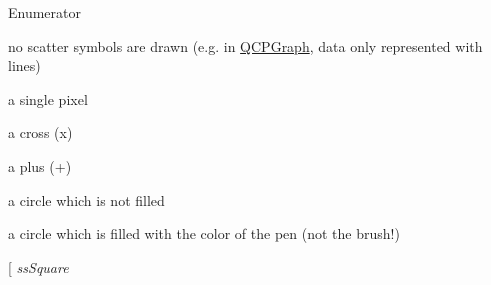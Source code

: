 \begin{Desc}
\item[Enumerator]\par
\begin{description}
\item[{\em 
\hypertarget{a00143_af66d0711d42fe78d96c28abadc67f26fa3ee9f603bc4623e9b98011e8829aad1d}{ss\+None}\label{a00143_af66d0711d42fe78d96c28abadc67f26fa3ee9f603bc4623e9b98011e8829aad1d}
}]no scatter symbols are drawn (e.\+g. in \hyperlink{a00031}{Q\+C\+P\+Graph}, data only represented with lines) \item[{\em 
\hypertarget{a00143_af66d0711d42fe78d96c28abadc67f26fa56816c1386f1356417bcc013adf0367c}{ss\+Dot}\label{a00143_af66d0711d42fe78d96c28abadc67f26fa56816c1386f1356417bcc013adf0367c}
}]a single pixel \item[{\em 
\hypertarget{a00143_af66d0711d42fe78d96c28abadc67f26fab1d52c10ee4b09fe17854be238055f30}{ss\+Cross}\label{a00143_af66d0711d42fe78d96c28abadc67f26fab1d52c10ee4b09fe17854be238055f30}
}]a cross (x) \item[{\em 
\hypertarget{a00143_af66d0711d42fe78d96c28abadc67f26fa82b8526e3bfa7d0cccc1fd5eb16505ac}{ss\+Plus}\label{a00143_af66d0711d42fe78d96c28abadc67f26fa82b8526e3bfa7d0cccc1fd5eb16505ac}
}]a plus (+) \item[{\em 
\hypertarget{a00143_af66d0711d42fe78d96c28abadc67f26fa13ed43d724ecefa84baae4179de3bd8d}{ss\+Circle}\label{a00143_af66d0711d42fe78d96c28abadc67f26fa13ed43d724ecefa84baae4179de3bd8d}
}]a circle which is not filled \item[{\em 
\hypertarget{a00143_af66d0711d42fe78d96c28abadc67f26fa6d1fd37ccd5f6fdea72992feb522a342}{ss\+Disc}\label{a00143_af66d0711d42fe78d96c28abadc67f26fa6d1fd37ccd5f6fdea72992feb522a342}
}]a circle which is filled with the color of the pen (not the brush!) \item[{\em 
\hypertarget{a00143_af66d0711d42fe78d96c28abadc67f26fae613e80d80910579c17a5ed90e9137b0}{ss\+Square}\label{a00143_af66d0711d42fe78d96c28abadc67f26fae613e80d80910579c17a5ed90e9137b0}
}
\end{description}
\end{Desc}
